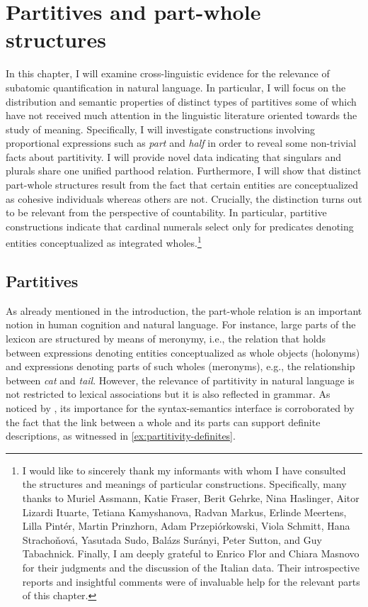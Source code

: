 \chapter{Partitives and part-whole structures}\label{ch:partitives-and-part-whole-structures}

In this chapter, I will examine cross-linguistic evidence for the relevance of subatomic quantification in natural language. In particular, I will focus on the distribution and semantic properties of distinct types of partitives some of which have not received much attention in the linguistic literature oriented towards the study of meaning. Specifically, I will investigate constructions involving proportional expressions such as \textit{part} and \textit{half} in order to reveal some non-trivial facts about partitivity. I will provide novel data indicating that singulars and plurals share one unified parthood relation. Furthermore, I will show that distinct part-whole structures result from the fact that certain entities are conceptualized as cohesive individuals whereas others are not. Crucially, the distinction turns out to be relevant from the perspective of countability. In particular, partitive constructions indicate that cardinal numerals select only for predicates denoting entities conceptualized as integrated wholes.\footnote{I would like to sincerely thank my informants with whom I have consulted the structures and meanings of particular constructions. Specifically, many thanks to Muriel Assmann, Katie Fraser, Berit Gehrke, Nina Haslinger, Aitor Lizardi Ituarte, Tetiana Kamyshanova, Radvan Markus, Erlinde Meertens, Lilla Pintér, Martin Prinzhorn, Adam Przepiórkowski, Viola Schmitt, Hana Strachoňová, Yasutada Sudo, Balázs Surányi, Peter Sutton, and Guy Tabachnick. Finally, I am deeply grateful to Enrico Flor and Chiara Masnovo for their judgments and the discussion of the Italian data. Their introspective reports and insightful comments were of invaluable help for the relevant parts of this chapter.}

\section{Partitives}\label{sec:partitives}

As already mentioned in the introduction, the part-whole relation is an important notion in human cognition and natural language. For instance, large parts of the lexicon are structured by means of meronymy, i.e., the relation that holds between expressions denoting entities conceptualized as whole objects (holonyms) and expressions denoting parts of such wholes (meronyms), e.g., the relationship between \textit{cat} and \textit{tail}. However, the relevance of partitivity in natural language is not restricted to lexical associations but it is also reflected in grammar. As noticed by \citet{hoeksema1996introduction}, its importance for the syntax-semantics interface is corroborated by the fact that the link between a whole and its parts can support definite descriptions, as witnessed in \ref{ex:partitivity-definites}.

